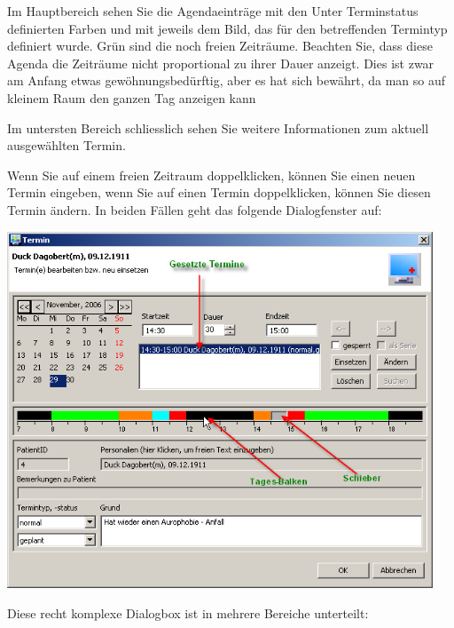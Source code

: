 Im Hauptbereich sehen Sie die Agendaeinträge mit
den Unter Terminstatus definierten Farben und mit jeweils dem Bild, das für den betreffenden Termintyp definiert wurde. Grün sind die noch
freien  Zeiträume. Beachten Sie, dass diese Agenda die Zeiträume nicht proportional zu ihrer Dauer anzeigt. Dies ist zwar am Anfang etwas
gewöhnungsbedürftig, aber es hat sich bewährt, da man so auf kleinem Raum den ganzen Tag anzeigen kann

Im untersten Bereich schliesslich sehen Sie weitere Informationen zum aktuell ausgewählten Termin.

Wenn Sie auf einem freien Zeitraum doppelklicken, können Sie einen neuen Termin eingeben, wenn Sie auf einen Termin doppelklicken,
können Sie diesen Termin ändern. In beiden Fällen geht das folgende Dialogfenster auf:



\includegraphics[width=5in]{images/use4.png}

Diese recht komplexe Dialogbox ist in mehrere Bereiche unterteilt:

